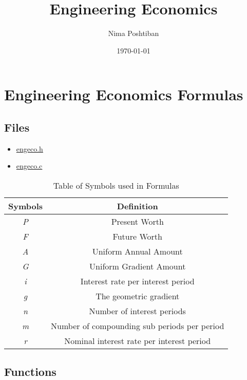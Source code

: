 \documentclass[english,12pt,a4paper,twoside,titlepage,leqno,fleqn]{article}
\title{Engineering Economics}
\author{Nima Poshtiban}
\date{\today}
\begin{document}
\maketitle
\tableofcontents

\section{Engineering Economics Formulas}

\subsection{Files}
\begin{itemize}
	\item \href{source}{engeco.h}
	\item \href{csource}{engeco.c}
\end{itemize}
\pagebreak
\begin{center}
\begin{table}[h]
\begin{tabular}{||c | c ||}
\hline
Symbols & Definition \\
\hline\hline
\textit{P} & 	Present Worth \\
\hline
\textit{F} & Future Worth \\
\hline
\textit{A} & Uniform Annual Amount \\
\hline
\textit{G}	& Uniform Gradient Amount \\
\hline
\textit{i} & Interest rate per interest period \\
\hline
\textit{g} & The geometric gradient \\
\hline
\textit{n} & Number of interest periods \\
\hline
\textit{m} & Number of compounding sub periods per period \\
\hline
\textit{r} & Nominal interest rate per interest period \\
\hline
\end{tabular}
\centering
\caption{Table of Symbols used in Formulas}
\end{table}
\end{center}\vspace{5cm}

\subsection{Functions}
\centering
\end{document}
